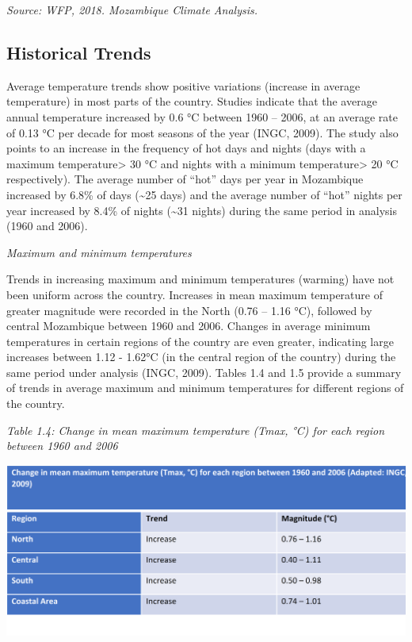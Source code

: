 \documentclass[
]{book}
\begin{document}
\emph{Source: WFP, 2018. Mozambique Climate Analysis.}

\hypertarget{historical-trends}{%
\subsection{Historical Trends}\label{historical-trends}}

Average temperature trends show positive variations (increase in average temperature) in most parts of the country. Studies indicate that the average annual temperature increased by 0.6 °C between 1960 -- 2006, at an average rate of 0.13 °C per decade for most seasons of the year (INGC, 2009). The study also points to an increase in the frequency of hot days and nights (days with a maximum temperature\textgreater{} 30 °C and nights with a minimum temperature\textgreater{} 20 °C respectively). The average number of ``hot'' days per year in Mozambique increased by 6.8\% of days (\textasciitilde25 days) and the average number of ``hot'' nights per year increased by 8.4\% of nights (\textasciitilde31 nights) during the same period in analysis (1960 and 2006).

\emph{Maximum and minimum temperatures}

Trends in increasing maximum and minimum temperatures (warming) have not been uniform across the country. Increases in mean maximum temperature of greater magnitude were recorded in the North (0.76 -- 1.16 °C), followed by central Mozambique between 1960 and 2006. Changes in average minimum temperatures in certain regions of the country are even greater, indicating large increases between 1.12 - 1.62°C (in the central region of the country) during the same period under analysis (INGC, 2009). Tables 1.4 and 1.5 provide a summary of trends in average maximum and minimum temperatures for different regions of the country.

\emph{Table 1.4: Change in mean maximum temperature (Tmax, °C) for each region between 1960 and 2006}

\includegraphics{Figure16.png}
\end{document}
